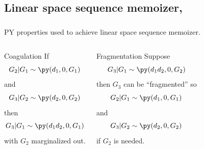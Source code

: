 \documentclass[16pt]{beamer}
\begin{document}
\begin{frame}[t]{}
\subsection{Linear space sequence memoizer, \citet{Wood2009}}
\begin{frame}[t] \frametitle{}
PY properties used to achieve linear space sequence memoizer.
\begin{columns}[c]  
\begin{block}{Coagulation \cite{Pitman1999, Ho2006}}
If \[G_2| G_1\sim\py(d_1,0,G_1)\] and \[G_3| G_2\sim\py(d_2,0,G_2)\] then
\[G_3|G_1\sim\py(d_1d_2,0,G_1)\] with $G_2$ marginalized out.
\label{thm:coag}
\end{block}
\begin{block}{Fragmentation \cite{Pitman1999, Ho2006,Wood2009}}
Suppose
 \[G_3| G_1\sim\py(d_1d_2,0,G_2)\]
 then $G_3$
 can be ``fragmented'' so 
 \[G_2 | G_1 \sim \py(d_1,0,G_1)\]
 and
  \[G_3| G_2\sim\py(d_2,0,G_2)\] 
  if $G_2$ is needed.
\end{block}
 \end{columns}
 \end{frame}



\end{frame}
\end{document}
